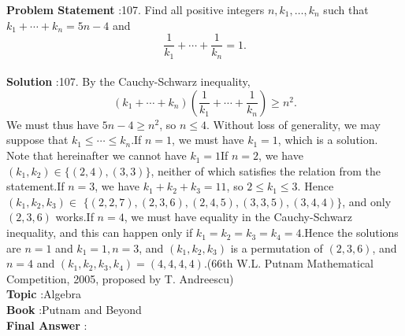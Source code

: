 \documentclass[10pt]{article}
\begin{document}
\textbf{Problem Statement} :107. Find all positive integers $n, k_{1}, \ldots, k_{n}$ such that $k_{1}+\cdots+k_{n}=5 n-4$ and$$ \frac{1}{k_{1}}+\cdots+\frac{1}{k_{n}}=1 . $$\\
\textbf{Solution} :107. By the Cauchy-Schwarz inequality,$$ \left(k_{1}+\cdots+k_{n}\right)\left(\frac{1}{k_{1}}+\cdots+\frac{1}{k_{n}}\right) \geq n^{2} . $$We must thus have $5 n-4 \geq n^{2}$, so $n \leq 4$. Without loss of generality, we may suppose that $k_{1} \leq \cdots \leq k_{n}$.If $n=1$, we must have $k_{1}=1$, which is a solution. Note that hereinafter we cannot have $k_{1}=1$If $n=2$, we have $\left(k_{1}, k_{2}\right) \in\{(2,4),(3,3)\}$, neither of which satisfies the relation from the statement.If $n=3$, we have $k_{1}+k_{2}+k_{3}=11$, so $2 \leq k_{1} \leq 3$. Hence $\left(k_{1}, k_{2}, k_{3}\right) \in$ $\{(2,2,7),(2,3,6),(2,4,5),(3,3,5),(3,4,4)\}$, and only $(2,3,6)$ works.If $n=4$, we must have equality in the Cauchy-Schwarz inequality, and this can happen only if $k_{1}=k_{2}=k_{3}=k_{4}=4$.Hence the solutions are $n=1$ and $k_{1}=1, n=3$, and $\left(k_{1}, k_{2}, k_{3}\right)$ is a permutation of $(2,3,6)$, and $n=4$ and $\left(k_{1}, k_{2}, k_{3}, k_{4}\right)=(4,4,4,4)$.(66th W.L. Putnam Mathematical Competition, 2005, proposed by T. Andreescu)\\
\textbf{Topic} :Algebra\\
\textbf{Book} :Putnam and Beyond\\
\textbf{Final Answer} :\\
\end{document}
